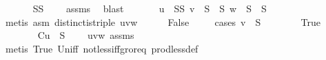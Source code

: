 \begin{isabellebody}
\ \ \ \ \isamarkupfalse%
\ {}{\isacharcolon}{\kern0pt}\ {\isachardoublequoteopen}S{}{\isasyminter}S{}\ {\isacharequal}{\kern0pt}\ {\isacharbraceleft}{\kern0pt}{\isacharbraceright}{\kern0pt}{\isachardoublequoteclose}\ \isamarkupfalse%
\ assms{\isacharparenleft}{\kern0pt}{}{\isacharparenright}{\kern0pt}\ \isamarkupfalse%
\ blast\isanewline
\ \ \ \ \isamarkupfalse%
\ {}{\isacharcolon}{\kern0pt}\ {\isachardoublequoteopen}u\ {\isasymin}\ S{}{\isasymunion}S{}{\isachardoublequoteclose}\ {\isachardoublequoteopen}v\ {\isasymin}\ S{}\ {\isasymunion}\ S{}{\isachardoublequoteclose}\ {\isachardoublequoteopen}w\ {\isasymin}\ S{}\ {\isasymunion}\ S{}{\isachardoublequoteclose}\isanewline
\ \ \ \ \ \ \isamarkupfalse%
\ {\isacharparenleft}{\kern0pt}metis\ asm{\isacharparenleft}{\kern0pt}{}{\isacharcomma}{\kern0pt}{}{\isacharcomma}{\kern0pt}{}{\isacharcomma}{\kern0pt}{}{\isacharparenright}{\kern0pt}\ distinct{\isacharunderscore}{\kern0pt}is{\isacharunderscore}{\kern0pt}triple\ uvw{\isacharparenleft}{\kern0pt}{}{\isacharparenright}{\kern0pt}{\isacharparenright}{\kern0pt}{\isacharplus}{\kern0pt}\isanewline
\isanewline
\ \ \ \ \isamarkupfalse%
\ False\isanewline
\ \ \ \ \isamarkupfalse%
{\isacharparenleft}{\kern0pt}cases\ {\isachardoublequoteopen}v\ {\isasymin}\ S{}{\isachardoublequoteclose}{\isacharparenright}{\kern0pt}\isanewline
\ \ \ \ \ \ \isamarkupfalse%
\ True\isanewline
\ \ \ \ \ \ \isamarkupfalse%
\ C{}{\isacharcolon}{\kern0pt}{\isachardoublequoteopen}u\ {\isasymin}\ S{}{\isachardoublequoteclose}\ \isamarkupfalse%
\ {}\ {}{\isacharparenleft}{\kern0pt}{}{\isacharparenright}{\kern0pt}\ uvw{\isacharparenleft}{\kern0pt}{}{\isacharparenright}{\kern0pt}\ assms{\isacharparenleft}{\kern0pt}{}{\isacharparenright}{\kern0pt}\isanewline
\ \ \ \ \ \ \ \ \isamarkupfalse%
\ {\isacharparenleft}{\kern0pt}metis\ True\ Un{\isacharunderscore}{\kern0pt}iff\ not{\isacharunderscore}{\kern0pt}less{\isacharunderscore}{\kern0pt}iff{\isacharunderscore}{\kern0pt}gr{\isacharunderscore}{\kern0pt}or{\isacharunderscore}{\kern0pt}eq\ prod{\isacharunderscore}{\kern0pt}less{\isacharunderscore}{\kern0pt}def{\isacharparenright}{\kern0pt}\isanewline

\end{isabellebody}

